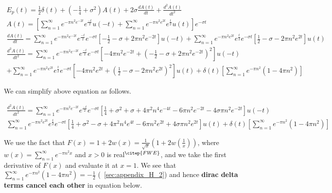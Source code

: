 \documentclass[11pt]{elsarticle}
\begin{document}
\begin{eqnarray*}\label{sec:App_H_eq_10} 
E_p(t) =  \frac{1}{2} \delta(t) + (- \frac{1}{4} +  \sigma^{2}) A(t) + 2 \sigma \frac{dA(t)}{dt}  + \frac{d^{2}A(t)}{dt^{2}}  \\
A(t) = [ \sum\limits_{n=1}^{\infty} e^{- \pi n^{2} e^{-2t} }  e^{\frac{-t}{2}} u(-t) + \sum\limits_{n=1}^{\infty} e^{- \pi n^{2} e^{2t} }   e^{\frac{t}{2}}   u(t) ]  e^{-\sigma t}  \\
\frac{dA(t)}{dt} = \sum\limits_{n=1}^{\infty} e^{- \pi n^{2} e^{-2t} } e^{\frac{-t}{2}}  e^{-\sigma t} [ -\frac{1}{2} - \sigma + 2 \pi n^{2} e^{-2t} ] u(-t) + \sum\limits_{n=1}^{\infty} e^{- \pi n^{2} e^{2t} } e^{\frac{t}{2}}  e^{-\sigma t} [ \frac{1}{2} - \sigma - 2 \pi n^{2} e^{2t} ] u(t) \\
\frac{d^{2}A(t)}{dt^{2}}  = \sum\limits_{n=1}^{\infty} e^{- \pi n^{2} e^{-2t} } e^{\frac{-t}{2}} e^{-\sigma t} [ - 4 \pi n^{2} e^{-2t} + (-\frac{1}{2} - \sigma + 2 \pi n^{2} e^{-2t} )^{2} ] u(-t) \\+  \sum\limits_{n=1}^{\infty} e^{- \pi n^{2} e^{2t} } e^{\frac{t}{2}} e^{-\sigma t} [ - 4 \pi n^{2} e^{2t} + (\frac{1}{2} - \sigma - 2 \pi n^{2} e^{2t} )^{2} ] u(t) + \delta(t) [\sum\limits_{n=1}^{\infty} e^{- \pi n^{2}} (1 - 4 \pi n^{2} ) ] 
\end{eqnarray*}
\begin{equation} \end{equation}

We can simplify above equation as follows.

\begin{eqnarray*}\label{sec:App_H_eq_11} 
\frac{d^{2}A(t)}{dt^{2}}  =   \sum\limits_{n=1}^{\infty} e^{- \pi n^{2} e^{-2t} } e^{\frac{-t}{2}}  e^{-\sigma t}  [ \frac{1}{4} + \sigma^2 +\sigma +   4 \pi^{2} n^{4} e^{-4t}  - 6 \pi n^{2} e^{-2t} - 4 \sigma \pi n^{2} e^{-2t}  ] u(-t) \\
\sum\limits_{n=1}^{\infty} e^{- \pi n^{2} e^{2t} } e^{\frac{t}{2}}  e^{-\sigma t}  [ \frac{1}{4} + \sigma^2 -\sigma +   4 \pi^{2} n^{4} e^{4t}  - 6 \pi n^{2} e^{2t} + 4 \sigma \pi n^{2} e^{2t}  ] u(t) + \delta(t) [\sum\limits_{n=1}^{\infty} e^{- \pi n^{2}} (1 - 4 \pi n^{2} ) ] 
\end{eqnarray*}
\begin{equation} \end{equation}



We use the fact that  $F(x) = 1 + 2 w(x) = \frac{1}{\sqrt{x}} (1 + 2 w(\frac{1}{x}) )$, where $w(x) = \sum\limits_{n=1}^{\infty} e^{- \pi n^{2}x }$ and $x > 0$ is real$^{\citep{FWE}}$, and we take the first derivative of $F(x)$ and evaluate it at $x=1$. We see that $\sum\limits_{n=1}^{\infty} e^{- \pi n^{2}} (1 - 4 \pi n^{2} )  = -\frac{1}{2}$ (~\ref{sec:appendix_H_2}) and hence \textbf{dirac delta terms cancel each other} in equation below. 
\end{document}
